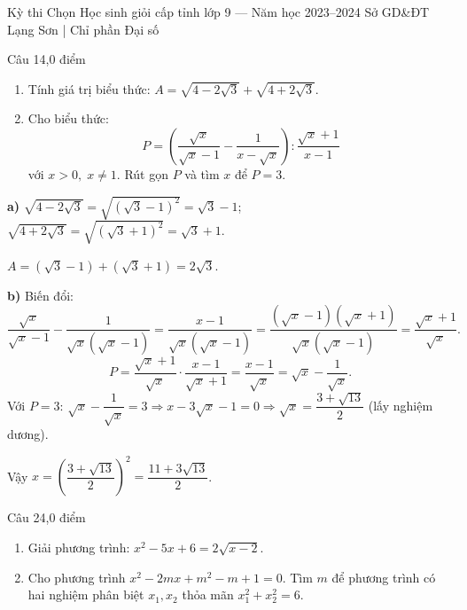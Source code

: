 ﻿%
%
  {Kỳ thi Chọn Học sinh giỏi cấp tỉnh lớp 9 — Năm học 2023--2024}%
  {Sở GD\&ĐT Lạng Sơn | Chỉ phần Đại số}

\begin{de_cau}{Câu 1}{4,0 điểm}
\begin{enumerate}[label=\alph*)]
  \item Tính giá trị biểu thức: $A = \sqrt{4-2\sqrt{3}} + \sqrt{4+2\sqrt{3}}$.
  \item Cho biểu thức:
  \[P = \left(\dfrac{\sqrt{x}}{\sqrt{x}-1} - \dfrac{1}{x-\sqrt{x}}\right) : \dfrac{\sqrt{x}+1}{x-1}\]
  với $x > 0,\; x \neq 1$. Rút gọn $P$ và tìm $x$ để $P = 3$.
\end{enumerate}
\end{de_cau}

\begin{loi_giai_cau}
\textbf{a)} $\sqrt{4-2\sqrt{3}}=\sqrt{(\sqrt{3}-1)^2}=\sqrt{3}-1$; $\sqrt{4+2\sqrt{3}}=\sqrt{(\sqrt{3}+1)^2}=\sqrt{3}+1$.

$A = (\sqrt{3}-1)+(\sqrt{3}+1)=\boxed{2\sqrt{3}}$.

\textbf{b)} Biến đổi:
\[\frac{\sqrt{x}}{\sqrt{x}-1}-\frac{1}{\sqrt{x}(\sqrt{x}-1)} = \frac{x-1}{\sqrt{x}(\sqrt{x}-1)} = \frac{(\sqrt{x}-1)(\sqrt{x}+1)}{\sqrt{x}(\sqrt{x}-1)} = \frac{\sqrt{x}+1}{\sqrt{x}}.\]
\[P = \frac{\sqrt{x}+1}{\sqrt{x}} \cdot \frac{x-1}{\sqrt{x}+1} = \frac{x-1}{\sqrt{x}} = \boxed{\sqrt{x}-\dfrac{1}{\sqrt{x}}}.\]
Với $P=3$: $\sqrt{x}-\dfrac{1}{\sqrt{x}}=3 \Rightarrow x-3\sqrt{x}-1=0 \Rightarrow \sqrt{x}=\dfrac{3+\sqrt{13}}{2}$ (lấy nghiệm dương).

Vậy $x = \left(\dfrac{3+\sqrt{13}}{2}\right)^2 = \dfrac{11+3\sqrt{13}}{2}$.
\end{loi_giai_cau}

\begin{de_cau}{Câu 2}{4,0 điểm}
\begin{enumerate}[label=\alph*)]
  \item Giải phương trình: $x^2 - 5x + 6 = 2\sqrt{x-2}$.
  \item Cho phương trình $x^2 - 2mx + m^2 - m + 1 = 0$. Tìm $m$ để phương trình có hai nghiệm phân biệt $x_1, x_2$ thỏa mãn $x_1^2 + x_2^2 = 6$.
\end{enumerate}
\end{de_cau}

